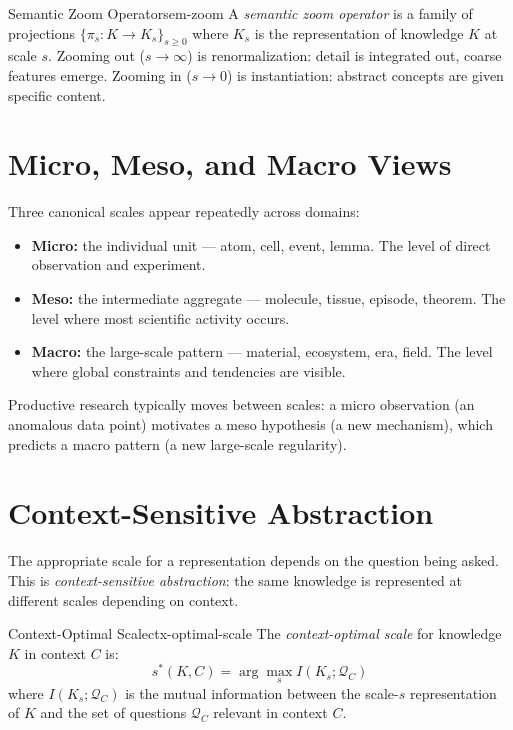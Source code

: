 \begin{definition}{Semantic Zoom Operator}{sem-zoom}
  A \emph{semantic zoom operator} is a family of projections
  $\{\pi_s : K \to K_s\}_{s \geq 0}$ where $K_s$ is the representation
  of knowledge $K$ at scale $s$. Zooming out ($s \to \infty$) is
  renormalization: detail is integrated out, coarse features emerge.
  Zooming in ($s \to 0$) is instantiation: abstract concepts are
  given specific content.
\end{definition}

\section{Micro, Meso, and Macro Views}

Three canonical scales appear repeatedly across domains:

\begin{itemize}
  \item \textbf{Micro:} the individual unit — atom, cell, event, lemma.
        The level of direct observation and experiment.
  \item \textbf{Meso:} the intermediate aggregate — molecule, tissue,
        episode, theorem. The level where most scientific activity occurs.
  \item \textbf{Macro:} the large-scale pattern — material, ecosystem,
        era, field. The level where global constraints and tendencies
        are visible.
\end{itemize}

Productive research typically moves between scales: a micro observation
(an anomalous data point) motivates a meso hypothesis (a new mechanism),
which predicts a macro pattern (a new large-scale regularity).

\section{Context-Sensitive Abstraction}

The appropriate scale for a representation depends on the question
being asked. This is \emph{context-sensitive abstraction}: the same
knowledge is represented at different scales depending on context.

\begin{definition}{Context-Optimal Scale}{ctx-optimal-scale}
  The \emph{context-optimal scale} for knowledge $K$ in context $C$
  is:
  \[
    s^*(K, C) = \arg\max_s I(K_s; \mathcal{Q}_C)
  \]
  where $I(K_s; \mathcal{Q}_C)$ is the mutual information between
  the scale-$s$ representation of $K$ and the set of questions
  $\mathcal{Q}_C$ relevant in context $C$.
\end{definition}


